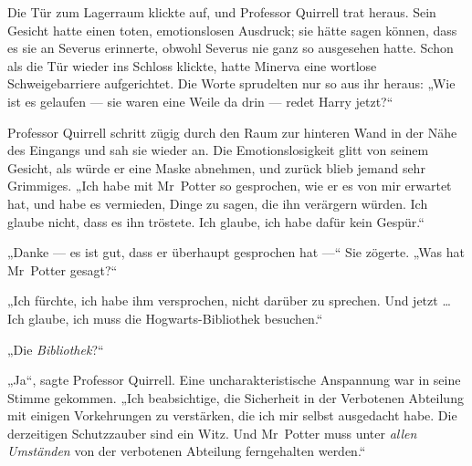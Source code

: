 \later


Die Tür zum Lagerraum klickte auf, und Professor Quirrell trat heraus. Sein Gesicht hatte einen toten, emotionslosen Ausdruck; sie hätte sagen können, dass es sie an Severus erinnerte, obwohl Severus nie ganz so ausgesehen hatte. Schon als die Tür wieder ins Schloss klickte, hatte Minerva eine wortlose Schweigebarriere aufgerichtet. Die Worte sprudelten nur so aus ihr heraus:
„Wie ist es gelaufen — sie waren eine Weile da drin — redet Harry jetzt?“

Professor Quirrell schritt zügig durch den Raum zur hinteren Wand in der Nähe des Eingangs und sah sie wieder an. Die Emotionslosigkeit glitt von seinem Gesicht, als würde er eine Maske abnehmen, und zurück blieb jemand sehr Grimmiges.
„Ich habe mit Mr~Potter so gesprochen, wie er es von mir erwartet hat, und habe es vermieden, Dinge zu sagen, die ihn verärgern würden. Ich glaube nicht, dass es ihn tröstete. Ich glaube, ich habe dafür kein Gespür.“

„Danke — es ist gut, dass er überhaupt gesprochen hat —“ Sie zögerte.
„Was hat Mr~Potter gesagt?“

„Ich fürchte, ich habe ihm versprochen, nicht darüber zu sprechen. Und jetzt … Ich glaube, ich muss die Hogwarts-Bibliothek besuchen.“

„Die \emph{Bibliothek}?“

„Ja“, sagte Professor Quirrell. Eine uncharakteristische Anspannung war in seine Stimme gekommen.
„Ich beabsichtige, die Sicherheit in der Verbotenen Abteilung mit einigen Vorkehrungen zu verstärken, die ich mir selbst ausgedacht habe. Die derzeitigen Schutzzauber sind ein Witz. Und Mr~Potter muss unter \emph{allen Umständen} von der verbotenen Abteilung ferngehalten werden.“

